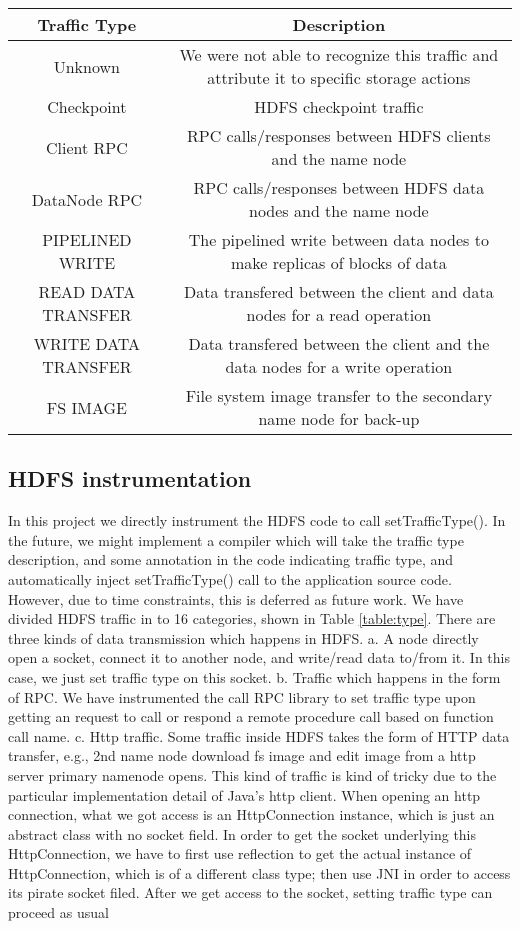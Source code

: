 \begin{table*}
\centering
\begin{tabular}{|c|c|} \hline
Traffic Type & Description\\ \hline
Unknown & We were not able to recognize this traffic and attribute it to specific storage actions \\ \hline
Checkpoint & HDFS checkpoint traffic\\ \hline
Client RPC & RPC calls/responses between HDFS clients and the name node\\ \hline
DataNode RPC & RPC calls/responses between HDFS data nodes and the name node\\ \hline
PIPELINED WRITE & The pipelined write between data nodes to make replicas of blocks of data\\ \hline
READ DATA TRANSFER & Data transfered between the client and data nodes for a read operation\\ \hline
WRITE DATA TRANSFER & Data transfered between the client and the data nodes for a write operation \\ \hline
FS IMAGE & File system image transfer to the secondary name node for back-up \\ \hline
\end{tabular}\label{table:type}
\caption{Description of each traffic type}
\end{table*}

\subsection{HDFS instrumentation}
     In this project we directly instrument the HDFS code to call setTrafficType(). In the future, we might implement a compiler which will take the traffic type description, and some annotation in the code indicating traffic type, and automatically inject setTrafficType() call to the application source code. However, due to time constraints, this is deferred as future work. 
       We have divided HDFS traffic in to 16 categories, shown in Table \ref{table:type}. There are three kinds of data transmission which happens in HDFS.
     a. A node directly open a socket, connect it to another node, and write/read data to/from it. In this case, we just set traffic type on this socket. 
     b. Traffic which happens in the form of RPC. We have instrumented the call RPC library to set traffic type upon getting an request to call or respond a remote procedure call based on function call name. 
     c. Http traffic. Some traffic inside HDFS takes the form of HTTP data transfer, e.g., 2nd name node download fs image and edit image from a http server primary namenode opens. This kind of traffic is kind of tricky due to the particular implementation detail of Java's http client. When opening an http connection, what we got access is an HttpConnection instance, which is just an abstract class with no socket field. In order to get the socket underlying this HttpConnection, we have to first use reflection to get the actual instance of HttpConnection, which is of a different class type; then use JNI in order to access its pirate socket filed. After we get access to the socket, setting traffic type can proceed as usual 

